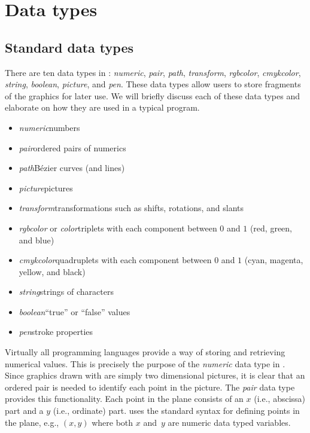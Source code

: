 \section{Data types}
\label{sec:datatypes}

\subsection{Standard data types}
There are ten data types in \MP{}: \textit{numeric}, \textit{pair},
\textit{path}, \textit{transform}, \textit{rgbcolor},
\textit{cmykcolor}, \textit{string}, \textit{boolean}, \textit{picture},
and \textit{pen}.  These data types allow users to store fragments of
the graphics for later use.  We will briefly discuss each of these data
types and elaborate on how they are used in a typical \MP{} program.

\renewcommand{\labelitemi}{$\diamond$}
\begin{itemize}
\item \textit{numeric}\Dash numbers
\item \textit{pair}\Dash ordered pairs of numerics
\item \textit{path}\Dash B\'{e}zier curves (and lines)
\item \textit{picture}\Dash pictures
\item \textit{transform}\Dash transformations such as shifts, rotations,
  and slants
\item \textit{rgbcolor} or \textit{color}\Dash triplets with each
  component between $0$ and $1$ (red, green, and blue)
\item \textit{cmykcolor}\Dash quadruplets with each component between
  $0$ and $1$ (cyan, magenta, yellow, and black)
\item \textit{string}\Dash strings of characters
\item \textit{boolean}\Dash ``true'' or ``false'' values
\item \textit{pen}\Dash stroke properties
\end{itemize}

Virtually all programming languages provide a way of storing and
retrieving numerical values.  This is precisely the purpose of the
\textit{numeric} data type in \MP.  Since graphics drawn with \MP{} are
simply two dimensional pictures, it is clear that an ordered pair is
needed to identify each point in the picture.  The \textit{pair} data
type provides this functionality.  Each point in the plane consists of
an $x$ (i.e., abscissa) part and a $y$ (i.e., ordinate) part.  \MP{}
uses the standard syntax for defining points in the plane, e.g., $(x,y)$
where both $x$ and~$y$ are numeric data typed variables.

